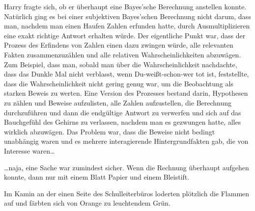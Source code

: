 Harry fragte sich, ob er überhaupt eine Bayes’sche Berechnung anstellen konnte. Natürlich ging es bei einer subjektiven Bayes’schen Berechnung nicht darum, dass man, nachdem man einen Haufen Zahlen erfunden hatte, durch Ausmultiplizieren eine exakt richtige Antwort erhalten würde. Der eigentliche Punkt war, dass der Prozess des Erfindens von Zahlen einen dazu zwingen würde, alle relevanten Fakten zusammenzuzählen und alle relativen Wahrscheinlichkeiten abzuwägen. Zum Beispiel, dass man, sobald man über die Wahrscheinlichkeit nachdachte, dass das Dunkle Mal nicht verblasst, wenn Du-weißt-schon-wer tot ist, feststellte, dass die Wahrscheinlichkeit nicht gering genug war, um die Beobachtung als starken Beweis zu werten. Eine Version des Prozesses bestand darin, Hypothesen zu zählen und Beweise aufzulisten, alle Zahlen aufzustellen, die Berechnung durchzuführen und dann die endgültige Antwort zu verwerfen und sich auf das Bauchgefühl des Gehirns zu verlassen, nachdem man es gezwungen hatte, alles wirklich abzuwägen. Das Problem war, dass die Beweise nicht bedingt unabhängig waren und es mehrere interagierende Hintergrundfakten gab, die von Interesse waren…

…naja, eine Sache war zumindest sicher. Wenn die Rechnung überhaupt aufgehen konnte, dann nur mit einem Blatt Papier und einem Bleistift.

Im Kamin an der einen Seite des Schulleiterbüros loderten plötzlich die Flammen auf und färbten sich von Orange zu leuchtendem Grün.

